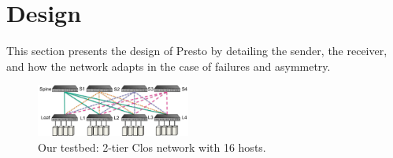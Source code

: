\section{Design}
\label{sec:design}

This section presents the design of Presto by detailing
the sender, the receiver, and how the network
adapts in the case of failures and asymmetry.


%
%
%
%
%
%
%

\begin{figure}[!t]
        \centering
  \includegraphics[width=0.45\textwidth,height=0.17\textwidth]{presto/figures/macro/macro_evaluation_topology_refined.pdf}
        \caption{Our testbed: 2-tier Clos network with 16 hosts.}
        \label{macro_evaluation_topology}
\end{figure}

